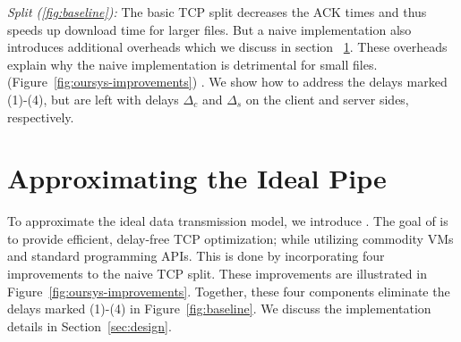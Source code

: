 \textit{Split (\autoref{fig:baseline}): } The basic TCP split decreases the ACK times and thus speeds up download time for larger files. But a naive implementation also introduces additional overheads which we discuss in section ~\ref{sec:approx}. These overheads explain why the naive implementation is detrimental for small files.  (Figure~\ref{fig:oursys-improvements}) . We show how to address the delays marked (1)-(4), but are left with delays $\Delta_c$ and $\Delta_s$ on the client and server sides, respectively. 

\section{Approximating the Ideal Pipe}\label{sec:approx}

To approximate the ideal data transmission model, we introduce \textit{\oursys}.
The goal of \oursys is to provide efficient, delay-free TCP optimization; while utilizing commodity VMs and standard programming APIs. This is done by incorporating four improvements to the naive TCP split. These improvements are illustrated in Figure~\ref{fig:oursys-improvements}. Together, these four components eliminate the delays marked (1)-(4) in Figure~\ref{fig:baseline}. We discuss the implementation details in Section~\ref{sec:design}.



